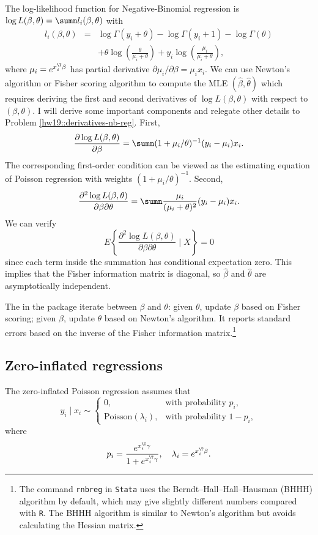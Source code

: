 The log-likelihood function for Negative-Binomial regression is $\log L(\beta, \theta) = \sumn l_i(\beta, \theta)$ with
\begin{eqnarray*}
 l_i(\beta, \theta)  
&=&     \log \Gamma(y_i+\theta) - \log \Gamma(y_i + 1) - \log \Gamma(\theta)    \\
 && + \theta\log \left( \frac{\theta}{\mu_i +\theta} \right) + y_i \log \left( \frac{ \mu_i  }{ \mu_i  + \theta} \right) , 
\end{eqnarray*}
where $\mu_i  = e^{x_{i}^{\T}\beta}$ has partial derivative $\partial \mu_i / \partial \beta = \mu_i x_i$. 
We can use Newton's algorithm or Fisher scoring algorithm to compute the MLE $(\hat\beta, \hat\theta)$ which requires deriving the first and second derivatives of $\log L(\beta, \theta)$ with respect to $(\beta, \theta)$. I will derive some important components and relegate other details to Problem \ref{hw19::derivatives-nb-reg}. First,
$$
\frac{ \partial \log L(\beta, \theta) }{\partial \beta} =
\sumn  (1+ \mu_i/\theta )^{-1} (y_i - \mu_i) x_i. 
$$
The corresponding first-order condition can be viewed as the estimating equation of Poisson regression with weights $  (1+ \mu_i/\theta )^{-1}$. Second,
$$
\frac{ \partial ^2 \log L(\beta, \theta) }{\partial \beta \partial \theta}
= \sumn  \frac{  \mu_i   }{  (\mu_i + \theta)^2  } (y_i - \mu_i) x_i.
$$
We can verify
$$
E\left\{ \frac{ \partial ^2 \log L(\beta, \theta) }{\partial \beta \partial \theta}  \mid X \right\} = 0
$$
since each term inside the summation has conditional expectation zero. This implies that the Fisher information matrix is diagonal, so $\hat\beta$ and $ \hat\theta$ are asymptotically independent. 

The  in the  package iterate between $\beta$ and $\theta$: given $\theta$, update $\beta$ based on Fisher scoring; given $\beta$, update $\theta$ based on Newton's algorithm. It reports standard errors based on the inverse of the Fisher information matrix.\footnote{
The command \texttt{rnbreg}   in \texttt{Stata} uses the Berndt--Hall--Hall--Hausman (BHHH) algorithm by default, which may give slightly different numbers compared with \texttt{R}. The BHHH algorithm is similar to Newton's algorithm but avoids calculating the Hessian matrix. 
}
 

\subsection{Zero-inflated regressions}

The zero-inflated Poisson regression assumes that 
\[
y_{i}\mid x_{i}\sim\begin{cases}
0, & \text{with probability }p_{i},\\
\text{Poisson}(\lambda_{i}), & \text{with probability }1-p_{i},
\end{cases}
\]
where 
$$
p_{i}  =\frac{e^{x_{i}^{\T}\gamma}}{1+e^{x_{i}^{\T}\gamma}},\quad 
\lambda_{i}  = e^{x_{i}^{\T}\beta}.
$$

